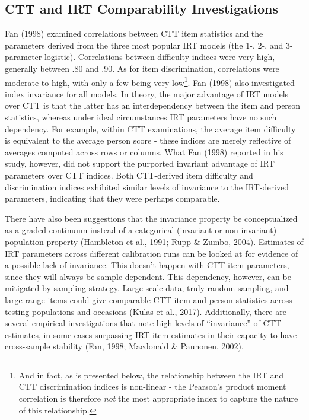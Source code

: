 \documentclass[
  man]{apa6}
\begin{document}
\hypertarget{ctt-and-irt-comparability-investigations}{%
\subsection{CTT and IRT Comparability Investigations}\label{ctt-and-irt-comparability-investigations}}

Fan (1998) examined correlations between CTT item statistics and the parameters derived from the three most popular IRT models (the 1-, 2-, and 3-parameter logistic). Correlations between difficulty indices were very high, generally between .80 and .90. As for item discrimination, correlations were moderate to high, with only a few being very low\footnote{And in fact, as is presented below, the relationship between the IRT and CTT discrimination indices is non-linear - the Pearson's product moment correlation is therefore \emph{not} the most appropriate index to capture the nature of this relationship.}. Fan (1998) also investigated index invariance for all models. In theory, the major advantage of IRT models over CTT is that the latter has an interdependency between the item and person statistics, whereas under ideal circumstances IRT parameters have no such dependency. For example, within CTT examinations, the average item difficulty is equivalent to the average person score - these indices are merely reflective of averages computed across rows or columns. What Fan (1998) reported in his study, however, did not support the purported invariant advantage of IRT parameters over CTT indices. Both CTT-derived item difficulty and discrimination indices exhibited similar levels of invariance to the IRT-derived parameters, indicating that they were perhaps comparable.

There have also been suggestions that the invariance property be conceptualized as a graded continuum instead of a categorical (invariant or non-invariant) population property (Hambleton et al., 1991; Rupp \& Zumbo, 2004). Estimates of IRT parameters across different calibration runs can be looked at for evidence of a possible lack of invariance. This doesn't happen with CTT item parameters, since they will always be sample-dependent. This dependency, however, can be mitigated by sampling strategy. Large scale data, truly random sampling, and large range items could give comparable CTT item and person statistics across testing populations and occasions (Kulas et al., 2017). Additionally, there are several empirical investigations that note high levels of ``invariance'' of CTT estimates, in some cases surpassing IRT item estimates in their capacity to have cross-sample stability (Fan, 1998; Macdonald \& Paunonen, 2002).
\end{document}
